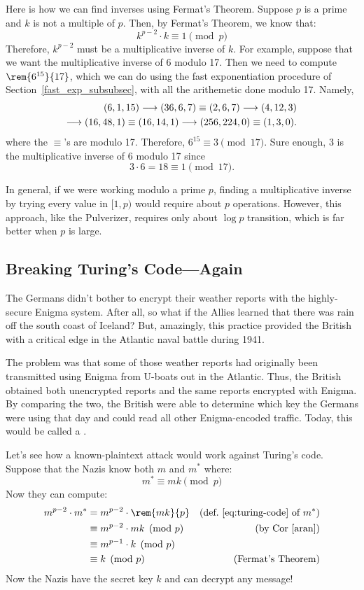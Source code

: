 Here is how we can find inverses using Fermat's Theorem.  Suppose $p$
is a prime and $k$ is not a multiple of $p$.  Then, by Fermat's
Theorem, we know that:
%
\[
k^{p-2} \cdot k \equiv 1 \pmod{p}
\]
Therefore, $k^{p-2}$ must be a multiplicative inverse of $k$.  For
example, suppose that we want the multiplicative inverse of 6 modulo
17.  Then we need to compute $\rem{6^{15}}{17}$, which we can do using
the fast exponentiation procedure of Section~\ref{fast_exp_subsubsec},
with all the arithemetic done modulo 17.  Namely,
\begin{align*}
(6,1,15) \mathrel{\longrightarrow} (36,6,7) \equiv (2,6,7) \mathrel{\longrightarrow} (4,12,3)\\
\mathrel{\longrightarrow} (16,48,1) \equiv (16,14,1) \mathrel{\longrightarrow} (256,224,0) \equiv (1,3,0).
\end{align*}
where the $\equiv$'s are modulo 17.  Therefore, $6^{15} \equiv 3
\pmod{17}$.  Sure enough, 3 is the multiplicative inverse of 6 modulo
17 since
\[
3 \cdot 6 = 18 \equiv 1 \pmod{17}.
\]

In general, if we were working modulo a prime $p$, finding a
multiplicative inverse by trying every value in $[1, p)$ would require
  about $p$ operations.  However, this approach, like the Pulverizer,
  requires only about $\log p$ transition, which is far better when
  $p$ is large.

\subsection{Breaking Turing's Code---Again}

The Germans didn't bother to encrypt their weather reports with the
highly-secure Enigma system.  After all, so what if the Allies learned
that there was rain off the south coast of Iceland?  But, amazingly, this
practice provided the British with a critical edge in the Atlantic naval
battle during 1941.

The problem was that some of those weather reports had originally been
transmitted using Enigma from U-boats out in the Atlantic.  Thus, the
British obtained both unencrypted reports and the same reports
encrypted with Enigma.  By comparing the two, the British were able to
determine which key the Germans were using that day and could read all
other Enigma-encoded traffic.  Today, this would be called a
.

Let's see how a known-plaintext attack would work against Turing's
code.  Suppose that the Nazis know both $m$ and $m^*$ where:
%
\[
m^* \equiv mk \pmod{p}
\]
%
Now they can compute:
%
\begin{align*}
m^{p-2} \cdot m^*
  & = m^{p-2} \cdot \rem{mk}{p}
                & \text{(def.~\eqref{eq:turing-code} of $m^*$)}\\
  & \equiv m^{p-2} \cdot mk \pmod{p} & \text{(by Cor~\ref{aran})}\\
  & \equiv m^{p-1} \cdot k \pmod{p}\\ %
  & \equiv k \pmod{p} & \text{(Fermat's Theorem)}
\end{align*}
%
Now the Nazis have the secret key $k$ and can decrypt any message!

